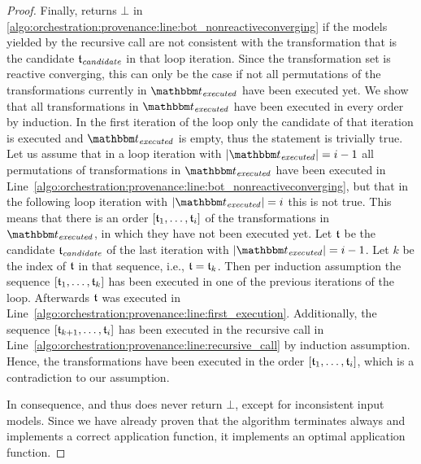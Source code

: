 \begin{proof}
    Finally,  returns $\bot$ in \autoref{algo:orchestration:provenance:line:bot_nonreactiveconverging} if the models yielded by the recursive call are not consistent with the transformation that is the candidate $\provalgcandidate$ in that loop iteration.
    Since the transformation set is reactive converging, this can only be the case if not all permutations of the transformations currently in $\provalgexecuted$ have been executed yet.
    We show that all transformations in $\provalgexecuted$ have been executed in every order by induction.
    In the first iteration of the loop only the candidate of that iteration is executed and $\provalgexecuted$ is empty, thus the statement is trivially true.
    Let us assume that in a loop iteration with $\abs{\provalgexecuted} = i-1$ all permutations of transformations in $\provalgexecuted$ have been executed in Line~\ref{algo:orchestration:provenance:line:bot_nonreactiveconverging}, but that in the following loop iteration with $\abs{\provalgexecuted} = i$ this is not true.
    This means that there is an order $\sequenced{\transformation{t}_{1}, \dots, \transformation{t}_{i}}$ of the transformations in $\provalgexecuted$, in which they have not been executed yet.
    Let $\transformation{t}$ be the candidate $\provalgcandidate$ of the last iteration with $\abs{\provalgexecuted} = i-1$. Let $k$ be the index of $\transformation{t}$ in that sequence, i.e., $\transformation{t} = \transformation{t}_{k}$. Then per induction assumption the sequence $\sequenced{\transformation{t}_{1}, \dots, \transformation{t}_{k}}$ has been executed in one of the previous iterations of the loop. 
    Afterwards $\transformation{t}$ was executed in Line~\ref{algo:orchestration:provenance:line:first_execution}.
    Additionally, the sequence $\sequenced{\transformation{t}_{k+1}, \dots, \transformation{t}_{i}}$ has been executed in the recursive call in Line~\ref{algo:orchestration:provenance:line:recursive_call} by induction assumption.
    Hence, the transformations have been executed in the order $\sequenced{\transformation{t}_{1}, \dots, \transformation{t}_{i}}$, which is a contradiction to our assumption.

    In consequence,  and thus  does never return $\bot$, except for inconsistent input models. Since we have already proven that the algorithm terminates always and implements a correct application function, it implements an optimal application function.
\end{proof}

